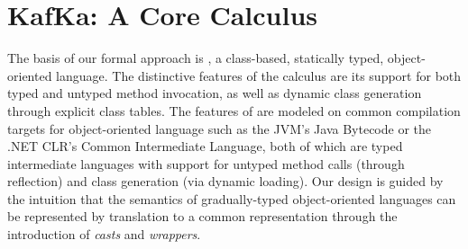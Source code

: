 \documentclass[runnningheads]{tex/llncs}
\begin{document}

\section{KafKa: A Core Calculus}\label{kafkacore}


\noindent The basis of our formal approach is \kafka, a class-based,
statically typed, object-oriented language. The distinctive features of the
calculus are its support for both typed and untyped method invocation, as well
as dynamic class generation through explicit class tables.  The features of
\kafka are modeled on common compilation targets for object-oriented language
such as the JVM's Java Bytecode or the .NET CLR's Common Intermediate
Language, both of which are typed intermediate languages with support for
untyped method calls (through reflection) and class generation (via dynamic
loading). Our design is guided by the intuition that the semantics of
gradually-typed object-oriented languages can be represented by translation to
a common representation through the introduction of \emph{casts} and
\emph{wrappers}.
\end{document}
